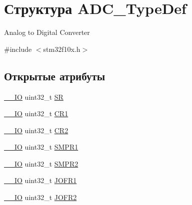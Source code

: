\hypertarget{struct_a_d_c___type_def}{}\section{Структура A\+D\+C\+\_\+\+Type\+Def}
\label{struct_a_d_c___type_def}


Analog to Digital Converter ~\newline
  




{\ttfamily \#include $<$stm32f10x.\+h$>$}

\subsection*{Открытые атрибуты}
\begin{DoxyCompactItemize}
\item 
\mbox{\hyperlink{group___c_m_s_i_s___c_m3__core__definitions_gaec43007d9998a0a0e01faede4133d6be}{\+\_\+\+\_\+\+IO}} uint32\+\_\+t \mbox{\hyperlink{struct_a_d_c___type_def_a9745df96e98f3cdc2d05ccefce681f64}{SR}}
\item 
\mbox{\hyperlink{group___c_m_s_i_s___c_m3__core__definitions_gaec43007d9998a0a0e01faede4133d6be}{\+\_\+\+\_\+\+IO}} uint32\+\_\+t \mbox{\hyperlink{struct_a_d_c___type_def_a89b1ff4376683dd2896ea8b32ded05b2}{C\+R1}}
\item 
\mbox{\hyperlink{group___c_m_s_i_s___c_m3__core__definitions_gaec43007d9998a0a0e01faede4133d6be}{\+\_\+\+\_\+\+IO}} uint32\+\_\+t \mbox{\hyperlink{struct_a_d_c___type_def_a1053a65a21af0d27afe1bf9cf7b7aca7}{C\+R2}}
\item 
\mbox{\hyperlink{group___c_m_s_i_s___c_m3__core__definitions_gaec43007d9998a0a0e01faede4133d6be}{\+\_\+\+\_\+\+IO}} uint32\+\_\+t \mbox{\hyperlink{struct_a_d_c___type_def_a73009a8122fcc628f467a4e997109347}{S\+M\+P\+R1}}
\item 
\mbox{\hyperlink{group___c_m_s_i_s___c_m3__core__definitions_gaec43007d9998a0a0e01faede4133d6be}{\+\_\+\+\_\+\+IO}} uint32\+\_\+t \mbox{\hyperlink{struct_a_d_c___type_def_a9e68fe36c4c8fbbac294b5496ccf7130}{S\+M\+P\+R2}}
\item 
\mbox{\hyperlink{group___c_m_s_i_s___c_m3__core__definitions_gaec43007d9998a0a0e01faede4133d6be}{\+\_\+\+\_\+\+IO}} uint32\+\_\+t \mbox{\hyperlink{struct_a_d_c___type_def_aa005e656f528aaad28d70d61c9db9b81}{J\+O\+F\+R1}}
\item 
\mbox{\hyperlink{group___c_m_s_i_s___c_m3__core__definitions_gaec43007d9998a0a0e01faede4133d6be}{\+\_\+\+\_\+\+IO}} uint32\+\_\+t \mbox{\hyperlink{struct_a_d_c___type_def_aa20f76044c11042dde41c1060853fb82}{J\+O\+F\+R2}}

\end{DoxyCompactItemize}
